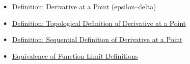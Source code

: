 \begin{dependencies}
\begin{itemize}
  \item \hyperref[def:derivative-at-a-point]{Definition: Derivative at a Point (epsilon--delta)}
  \item \hyperref[def:topological-definition-of-derivative-at-a-point]{Definition: Topological Definition of Derivative at a Point}
  \item \hyperref[def:sequential-definition-of-derivative-at-a-point]{Definition: Sequential Definition of Derivative at a Point}
  \item \hyperref[thm:equivalence-of-function-limit-definitions]{Equivalence of Function Limit Definitions}
\end{itemize}
\end{dependencies}

\clearpage
